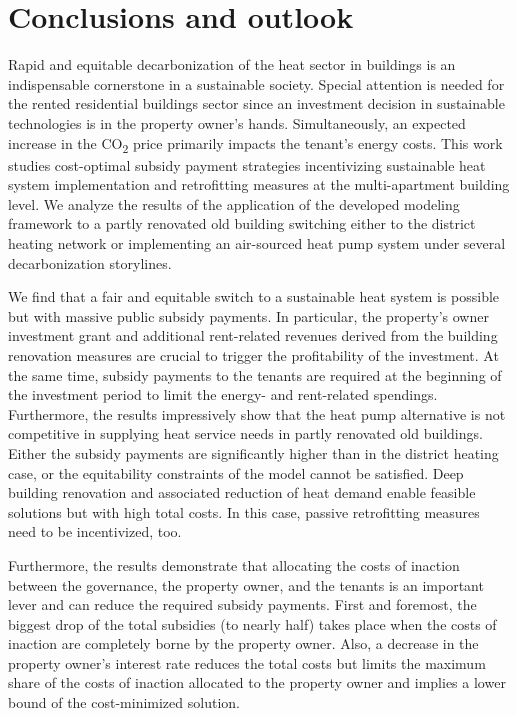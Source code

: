 \section{Conclusions and outlook}\label{conclusions}
Rapid and equitable decarbonization of the heat sector in buildings is an indispensable cornerstone in a sustainable society. Special attention is needed for the rented residential buildings sector since an investment decision in sustainable technologies is in the property owner's hands. Simultaneously, an expected increase in the CO\textsubscript{2} price primarily impacts the tenant's energy costs. This work studies cost-optimal subsidy payment strategies incentivizing sustainable heat system implementation and retrofitting measures at the multi-apartment building level. We analyze the results of the application of the developed modeling framework to a partly renovated old building switching either to the district heating network or implementing an air-sourced heat pump system under several decarbonization storylines.\vspace{0.5cm}

We find that a fair and equitable switch to a sustainable heat system is possible but with massive public subsidy payments. In particular, the property's owner investment grant and additional rent-related revenues derived from the building renovation measures are crucial to trigger the profitability of the investment. At the same time, subsidy payments to the tenants are required at the beginning of the investment period to limit the energy- and rent-related spendings. Furthermore, the results impressively show that the heat pump alternative is not competitive in supplying heat service needs in partly renovated old buildings. Either the subsidy payments are significantly higher than in the district heating case, or the equitability constraints of the model cannot be satisfied. Deep building renovation and associated reduction of heat demand enable feasible solutions but with high total costs. In this case, passive retrofitting measures need to be incentivized, too.\vspace{0.5cm}

Furthermore, the results demonstrate that allocating the costs of inaction between the governance, the property owner, and the tenants is an important lever and can reduce the required subsidy payments. First and foremost, the biggest drop of the total subsidies (to nearly half) takes place when the costs of inaction are completely borne by the property owner. Also, a decrease in the property owner's interest rate reduces the total costs but limits the maximum share of the costs of inaction allocated to the property owner and implies a lower bound of the cost-minimized solution.\vspace{0.5cm}


